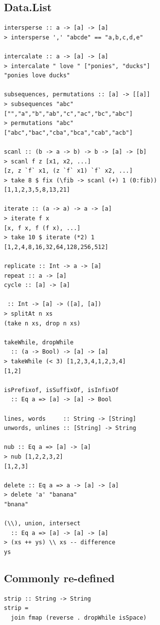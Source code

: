 \begin{multicols}{2}
\begin{box1}
\subsection *{Data.List}
\begin{verbatim}
intersperse :: a -> [a] -> [a]
> intersperse ',' "abcde" == "a,b,c,d,e"

intercalate :: a -> [a] -> [a]
> intercalate " love " ["ponies", "ducks"]
"ponies love ducks"

subsequences, permutations :: [a] -> [[a]]
> subsequences "abc"
["","a","b","ab","c","ac","bc","abc"]
> permutations "abc"
["abc","bac","cba","bca","cab","acb"]

scanl :: (b -> a -> b) -> b -> [a] -> [b]
> scanl f z [x1, x2, ...]
[z, z `f` x1, (z `f` x1) `f` x2, ...]
> take 8 $ fix (\fib -> scanl (+) 1 (0:fib))
[1,1,2,3,5,8,13,21]

iterate :: (a -> a) -> a -> [a]
> iterate f x
[x, f x, f (f x), ...]
> take 10 $ iterate (*2) 1
[1,2,4,8,16,32,64,128,256,512]

replicate :: Int -> a -> [a]
repeat :: a -> [a]
cycle :: [a] -> [a]

 :: Int -> [a] -> ([a], [a])
> splitAt n xs
(take n xs, drop n xs)

takeWhile, dropWhile
  :: (a -> Bool) -> [a] -> [a]
> takeWhile (< 3) [1,2,3,4,1,2,3,4]
[1,2]

isPrefixof, isSuffixOf, isInfixOf
  :: Eq a => [a] -> [a] -> Bool

lines, words     :: String -> [String]
unwords, unlines :: [String] -> String

nub :: Eq a => [a] -> [a]
> nub [1,2,2,3,2]
[1,2,3]

delete :: Eq a => a -> [a] -> [a]
> delete 'a' "banana"
"bnana"

(\\), union, intersect
  :: Eq a => [a] -> [a] -> [a]
> (xs ++ ys) \\ xs -- difference
ys
\end{verbatim}
\end{box1}

\begin{box2}
\subsection *{Commonly re-defined}
\begin{verbatim}
strip :: String -> String
strip =
  join fmap (reverse . dropWhile isSpace)


\end{verbatim}
\end{box2}
\end{multicols}
